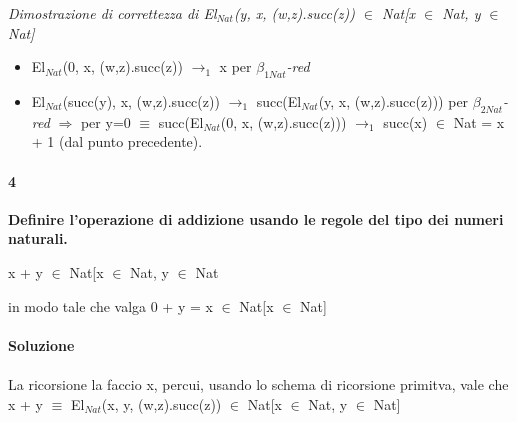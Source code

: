 \scriptsize
\begin{adjustwidth}{-10em}{}
\begin{prooftree}
\end{prooftree}
\end{adjustwidth}
\noindent
\normalsize \textit{Dimostrazione di correttezza di El$_{Nat}$(y, x, (w,z).succ(z)) $\in$ Nat[x $\in$ Nat, y $\in$ Nat]}
\begin{itemize}
\item El$_{Nat}$(0, x, (w,z).succ(z))  $\rightarrow_1$ x per \textit{$\beta_{1Nat}$-red}
\item El$_{Nat}$(succ(y), x, (w,z).succ(z)) $\rightarrow_1$ succ(El$_{Nat}$(y, x, (w,z).succ(z))) per \textit{$\beta_{2Nat}$-red} $\Rightarrow$ per y=0 $\equiv$ succ(El$_{Nat}$(0, x, (w,z).succ(z))) $\rightarrow_1$ succ(x) $\in$ Nat = x + 1  (dal punto precedente).
\end{itemize}

\paragraph{4}
\textbf{Definire l'operazione di addizione usando le regole del tipo dei numeri naturali.}
\begin{center} x + y $\in$ Nat[x $\in$ Nat, y $\in$ Nat\end{center}
in modo tale che valga 0 + y = x $\in$  Nat[x $\in$ Nat]
\\\\
\textbf{Soluzione}\\\\
La ricorsione la faccio x, percui, usando lo schema di ricorsione primitva, vale che x + y $\equiv$ El$_{Nat}$(x, y, (w,z).succ(z)) $\in$ Nat[x $\in$ Nat, y $\in$ Nat]

